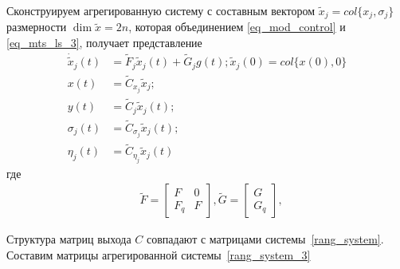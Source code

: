 Сконструируем агрегированную систему с составным вектором \newline $\tilde{x}_j=col\{x_j,\sigma_j\}$ размерности $ \dim \tilde{x} = 2n$, которая объединением \ref{eq_mod_control} и \ref{eq_mts_ls_3}, получает представление
\begin{align}\label{rang_system_3}
	\dot{\tilde{x}}_j (t) &= \tilde{F}_j \tilde{x}_j (t) + \tilde{G}_j g(t); 
	\tilde{x}_j (0) = col \{x(0), 0\}\\
	x(t) &= \tilde{C}_{x_j} \tilde{x}_j;\\
	y(t) &= \tilde{C}_j \tilde{x}_j (t);\\
	\sigma_j (t) &= \tilde{C}_{\sigma_j} \tilde{x}_j (t);\\
	\eta_j (t) &= \tilde{C}_{\eta_j} \tilde{x}_j (t)
\end{align}
где 
\begin{align*}
	&\tilde{{F}} =
	\begin{bmatrix}
	{F} & 0\\
	{F}_{q} & {F}
	\end{bmatrix},
	\tilde{{G}} = 
	\begin{bmatrix}
	{G}\\
	{G}_{q}
	\end{bmatrix},
\end{align*}

Структура матриц выхода $C$ совпадают с матрицами системы~\ref{rang_system}.
Составим матрицы агрегированной системы~\ref{rang_system_3}

